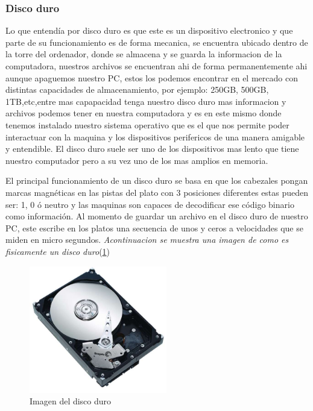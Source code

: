 \documentclass{article}
\begin{document}
\subsubsection{Disco duro}
\noindent
Lo que entendía por disco duro es que este es un dispositivo electronico y que parte de su funcionamiento es de forma mecanica, se encuentra ubicado dentro de la torre del ordenador, donde se almacena y se guarda la informacion de la computadora, nuestros archivos se encuentran ahi de forma permanentemente ahi aunque apaguemos nuestro PC, estos los podemos encontrar en el mercado con distintas capacidades de almacenamiento, por ejemplo: 250GB, 500GB, 1TB,etc,entre mas capapacidad tenga nuestro disco duro mas informacion y archivos podemos tener en nuestra computadora y es en este mismo donde tenemos instalado nuestro sistema operativo que es el que nos permite poder interactuar con la maquina y los dispositivos perifericos de una manera amigable y entendible. El disco duro suele ser uno de los dispositivos mas lento que tiene nuestro computador pero a su vez uno de los mas amplios en memoria. 

\vspace{0.2cm}
\noindent
El principal funcionamiento de un disco duro se basa en que los cabezales pongan marcas magnéticas en las pistas del plato con 3 posiciones diferentes estas pueden ser: 1, 0 ó neutro y las maquinas son capaces de decodificar ese código binario como información. Al momento de guardar un archivo en el disco duro de nuestro PC, este escribe en los platos una secuencia de unos y ceros a velocidades que se miden en micro segundos. \cite{qloudea}
\vspace{0.2cm}
\noindent
\emph{Acontinuacion se muestra una imagen de como es fisicamente un disco duro}(\ref{fig:disco_duro})

\begin{figure}[h]
\includegraphics[width=6cm]{disco_duro.jpg}
\centering
\caption{Imagen del disco duro}
\label{fig:disco_duro}
\end{figure}
\end{document}
